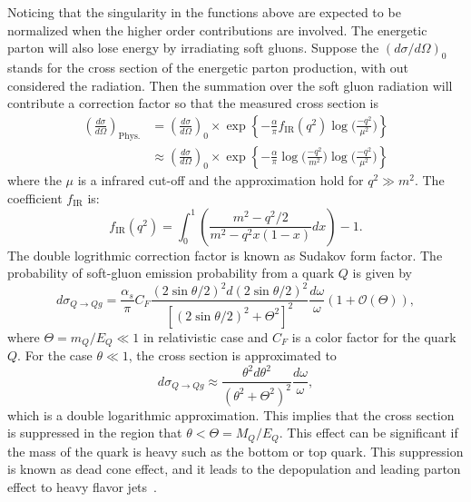 Noticing that the singularity in the functions above are expected to be normalized when the higher order contributions are involved. The energetic parton will also lose energy by irradiating soft gluons. Suppose the $(d\sigma/d\Omega)_0$ stands for the cross section of the energetic parton production, with out considered the radiation. Then the summation over the soft gluon radiation will contribute a correction factor so that the measured cross section is
\begin{equation}
\begin{aligned}
  \left(\frac{d\sigma}{d\Omega}\right)_{\text{Phys.}} & = \left(\frac{d\sigma}{d\Omega}\right)_0\times\exp\left\{-\frac{\alpha}{\pi}f_{\text{IR}}(q^2)\log\bigg(\frac{-q^2}{\mu^2}\bigg)\right\}\\
  & \approx \left(\frac{d\sigma}{d\Omega}\right)_0\times\exp\left\{-\frac{\alpha}{\pi}\log\bigg(\frac{-q^2}{m^2}\bigg)\log\bigg(\frac{-q^2}{\mu^2}\bigg)\right\}
\end{aligned}
\end{equation}
where the $\mu$ is a infrared cut-off and the approximation hold for $q^2\gg m^2$. The coefficient $f_{\text{IR}}$ is:
\begin{equation}
  f_{\text{IR}}(q^2)=\int_0^1\left(\frac{m^2-q^2/2}{m^2-q^2 x(1-x)}dx\right)-1.
\end{equation}
The double logrithmic correction factor is known as Sudakov form factor. The probability of soft-gluon emission probability from a quark $Q$ is given by
\begin{equation}
  d\sigma_{Q\to Q g}= \frac{\alpha_s}{\pi}C_F\frac{(2\sin\theta/2)^2d(2\sin\theta/2)^2}{[(2\sin\theta/2)^2+\Theta^2]^2}\frac{d\omega}{\omega}(1+\mathcal{O}(\Theta)),
\end{equation}
where $\Theta = m_Q/E_Q\ll 1$ in relativistic case and $C_F$ is a color factor for the quark $Q$. For the case $\theta\ll 1$, the cross section is approximated to
\begin{equation}
   d\sigma_{Q\to Q g} \approx \frac{\theta^2d\theta^2}{(\theta^2+\Theta^2)^2}\frac{d\omega}{\omega},
\end{equation} 
which is a double logarithmic approximation. This implies that the cross section is suppressed in the region that $\theta<\Theta = M_Q/E_Q$. This effect can be significant if the mass of the quark is heavy such as the bottom or top quark. This suppression is known as dead cone effect, and it leads to the depopulation and leading parton effect to heavy flavor jets~\cite{Dokshitzer:1991fd}.


